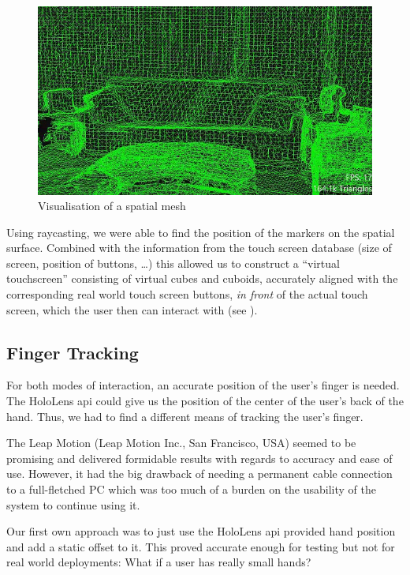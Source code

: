 \begin{figure}[thpb]
	\centering
	\includegraphics[width=\columnwidth]{spatialmapping.jpg}
	\caption{Visualisation of a spatial mesh \cite{spatialmapping}}
	\label{fig:spatialmesh}
\end{figure}

Using raycasting, we were able to find the position of the markers on the spatial surface.
Combined with the information from the touch screen database (size of screen, position of buttons, \dots) this allowed us to construct a \enquote{virtual touchscreen} consisting of virtual cubes and cuboids, accurately aligned with the corresponding real world touch screen buttons, \emph{in front} of the actual touch screen, which the user then can interact with (see ).


\subsection{Finger Tracking}
\label{subsec:finger}
For both modes  of interaction, an accurate position of the user's finger is needed.
The HoloLens \ac{api} could give us the position of the center of the user's  back of the hand.
Thus, we had to find a different means of tracking the user's finger.

The Leap Motion (Leap Motion Inc., San Francisco, USA) seemed to be promising and delivered formidable results with regards to accuracy and ease of use.
However, it had the big drawback of needing a permanent cable connection to a full-fletched PC which was too much of a burden on the usability of the system to continue using it.

Our first own approach was to just use the HoloLens \ac{api} provided hand position and add a static offset to it.
This proved accurate enough for testing but not for real world deployments:
What if a user has really small hands?

